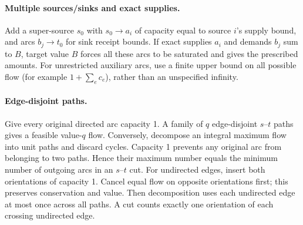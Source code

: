 \documentclass[10pt]{article}
\theoremstyle{definition}
\begin{document}
\paragraph{Multiple sources/sinks and exact supplies.}
Add a super-source $s_0$ with $s_0\to a_i$ of capacity equal to source $i$'s
supply bound, and arcs $b_j\to t_0$ for sink receipt bounds.
If exact supplies $a_i$ and demands $b_j$ sum to $B$, target value $B$ forces
all these arcs to be saturated and gives the prescribed amounts.
For unrestricted auxiliary arcs, use a finite upper bound on all possible
flow (for example $1+\sum_e c_e$), rather than an unspecified infinity.

\paragraph{Edge-disjoint paths.}
Give every original directed arc capacity 1. A family of $q$ edge-disjoint
$s$--$t$ paths gives a feasible value-$q$ flow. Conversely, decompose an
integral maximum flow into unit paths and discard cycles. Capacity 1 prevents
any original arc from belonging to two paths. Hence their maximum number
equals the minimum number of outgoing arcs in an $s$--$t$ cut.
For undirected edges, insert both orientations of capacity 1. Cancel equal
flow on opposite orientations first; this preserves conservation and value.
Then decomposition uses each undirected edge at most once across all paths.
A cut counts exactly one orientation of each crossing undirected edge.
\end{document}
